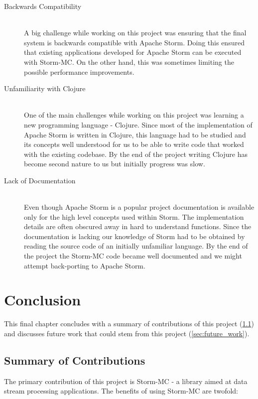 \documentclass[bsc,logo,frontabs,twoside,singlespacing,normalheadings,parskip]{infthesis}\usepackage[]{graphicx}\usepackage[]{color}
\begin{document}
\begin{description}
	\item[Backwards Compatibility] \hfill \\
	A big challenge while working on this project was ensuring that the final system is backwards compatible with Apache Storm. Doing this ensured that existing applications developed for Apache Storm can be executed with Storm-MC. On the other hand, this was sometimes limiting the possible performance improvements.
	\item[Unfamiliarity with Clojure] \hfill \\
	One of the main challenges while working on this project was learning a new programming language - Clojure. Since most of the implementation of Apache Storm is written in Clojure, this language had to be studied and its concepts well understood for us to be able to write code that worked with the existing codebase. By the end of the project writing Clojure has become second nature to us but initially progress was slow.
	\item[Lack of Documentation] \hfill \\
	Even though Apache Storm is a popular project documentation is available only for the high level concepts used within Storm. The implementation details are often obscured away in hard to understand functions. Since the documentation is lacking our knowledge of Storm had to be obtained by reading the source code of an initially unfamiliar language. By the end of the project the Storm-MC code became well documented and we might attempt back-porting to Apache Storm.
\end{description}

\clearpage{}

\clearpage{}\chapter{Conclusion}

This final chapter concludes with a summary of contributions of this project (\ref{sec:contribs}) and discusses future work that could stem from this project (\ref{sec:future_work}).

\section{Summary of Contributions}
\label{sec:contribs}

The primary contribution of this project is Storm-MC - a library aimed at data stream processing applications. The benefits of using Storm-MC are twofold:
\end{document}
